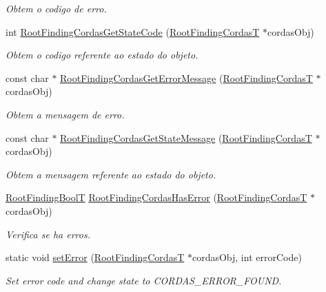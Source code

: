 \begin{CompactItemize}
\begin{CompactList}\small\item\em Obtem o codigo de erro. \item\end{CompactList}\item 
int \hyperlink{group____cordas_g67aaf428f922e7d15a7fbd5a4508ffd7}{RootFindingCordasGetStateCode} (\hyperlink{structRootFindingCordas}{RootFindingCordasT} $\ast$cordasObj)
\begin{CompactList}\small\item\em Obtem o codigo referente ao estado do objeto. \item\end{CompactList}\item 
const char $\ast$ \hyperlink{group____cordas_g5a6750a998093e1701c8a01ae24e9cc2}{RootFindingCordasGetErrorMessage} (\hyperlink{structRootFindingCordas}{RootFindingCordasT} $\ast$cordasObj)
\begin{CompactList}\small\item\em Obtem a mensagem de erro. \item\end{CompactList}\item 
const char $\ast$ \hyperlink{group____cordas_ga065f13f2ec77b2e949190c1aca9ef9d}{RootFindingCordasGetStateMessage} (\hyperlink{structRootFindingCordas}{RootFindingCordasT} $\ast$cordasObj)
\begin{CompactList}\small\item\em Obtem a mensagem referente ao estado do objeto. \item\end{CompactList}\item 
\hyperlink{RootFindingCommon_8h_31228d356f5429fa5ba7f206e4dee12f}{RootFindingBoolT} \hyperlink{group____cordas_g66931e7adda820b82bb64bc671d7d550}{RootFindingCordasHasError} (\hyperlink{structRootFindingCordas}{RootFindingCordasT} $\ast$cordasObj)
\begin{CompactList}\small\item\em Verifica se ha erros. \item\end{CompactList}\item 
static void \hyperlink{group____cordas_gb608a6128f3fe5d4a10990198b1dac4b}{setError} (\hyperlink{structRootFindingCordas}{RootFindingCordasT} $\ast$cordasObj, int errorCode)
\begin{CompactList}\small\item\em Set error code and change state to CORDAS\_\-ERROR\_\-FOUND. \item\end{CompactList}\item 

\end{CompactItemize}
